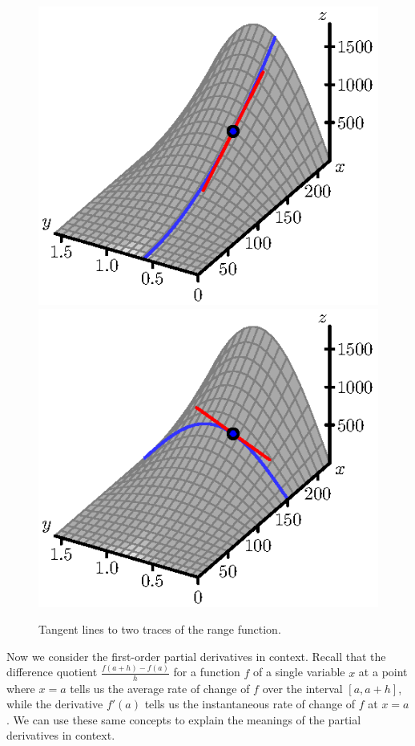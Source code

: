 \begin{figure}[ht]
  \begin{center}
    \includegraphics{figures/fig_10_2_trace_tangent_y.eps}
    \hspace*{0.5in}
    \includegraphics{figures/fig_10_2_trace_tangent_x.eps}
  \end{center}
  \caption{Tangent lines to two traces of the range function.} 
  \label{F:10.2.trace.tangent}
\end{figure}

Now we consider the first-order partial derivatives in context. Recall
that the difference quotient $\frac{f(a+h)-f(a)}{h}$ for a function
$f$ of a single variable $x$ at a point where $x=a$ tells us the
average rate of change of $f$ over the interval $[a,a+h]$, while the
derivative $f'(a)$ tells us the instantaneous rate of change of $f$ at
$x=a$.
We can use these same concepts to
explain the meanings of the partial derivatives in context.

